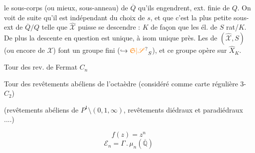le sous-corps (ou mieux, sous-anneau) de $\overline{Q}$
qu'ils engendrent, ext. finie de $Q$. On voit de
suite qu'il est indépendant du choix de
$s$, et que c'est la plus petite sous-ext
de $\overline{Q}/Q$ telle que $\widehat{\mathscr X}$ puisse se descendre  : $K$
de façon que les él. de $S$  rat/$K$.
De plus la descente en question est unique,
à isom unique près. Les  de
$(\widehat{\mathscr X},S)$ (ou encore de $\mathscr X$) font un groupe
fini ($\hookrightarrow \unsure{\mathfrak S|\mathscr S}_S$), et ce groupe opère 
sur $\widehat X_K$.

Tour des rev. de Fermat $C_n$

Tour des revêtements abéliens de l'octaèdre
(considéré comme carte régulière 3- $C_2$)


(revêtements abéliens de
$P^1\setminus(0,1,\infty)$, revêtements
diédraux et paradiédraux
....)

\[ f(z)=z^n \]
\[ \mathcal E_n=\Gamma\mathbin{.}\mu_n(\overline{\mathbb Q}) \]

